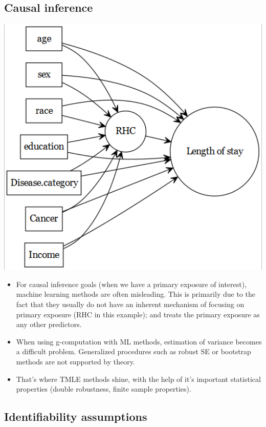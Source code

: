 \documentclass[
]{book}
\providecommand{\tightlist}{%
  \setlength{\itemsep}{0pt}\setlength{\parskip}{0pt}}
\begin{document}
\hypertarget{causal-inference}{%
\subsection{Causal inference}\label{causal-inference}}

\includegraphics[width=6.72in]{images/dagci}

\begin{itemize}
\tightlist
\item
  For causal inference goals (when we have a primary exposure of interest), machine learning methods are often misleading. This is primarily due to the fact that they usually do not have an inherent mechanism of focusing on primary exposure (RHC in this example); and treats the primary exposure as any other predictors.
\item
  When using g-computation with ML methods, estimation of variance becomes a difficult problem. Generalized procedures such as robust SE or bootstrap methods are not supported by theory.
\item
  That's where TMLE methods shine, with the help of it's important statistical properties (double robustness, finite sample properties).
\end{itemize}

\hypertarget{identifiability-assumptions}{%
\subsection{Identifiability assumptions}\label{identifiability-assumptions}}
\end{document}
